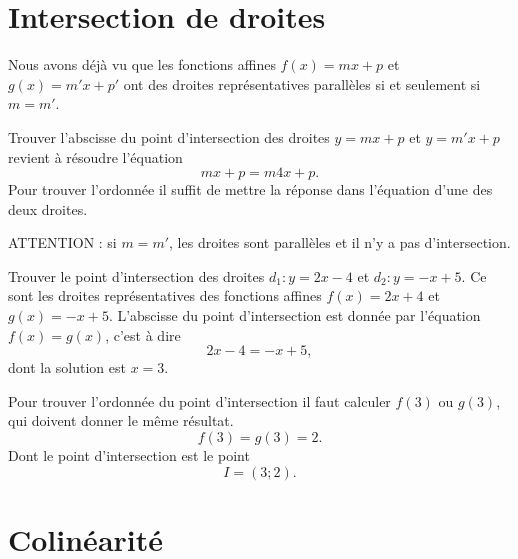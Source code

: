 \section{Intersection de droites}

Nous avons déjà vu que les fonctions affines \( f(x)=mx+p\) et \( g(x)=m'x+p'\) ont des droites représentatives parallèles si et seulement si \( m=m'\).

\begin{Aretenir}
    Trouver l'abscisse du point d'intersection des droites \( y=mx+p\) et \( y=m'x+p\) revient à résoudre l'équation
    \begin{equation}
        mx+p=m4x+p.
    \end{equation}
    Pour trouver l'ordonnée il suffit de mettre la réponse dans l'équation d'une des deux droites.

    ATTENTION : si \( m=m'\), les droites sont parallèles et il n'y a pas d'intersection.
\end{Aretenir}

\begin{example}
    Trouver le point d'intersection des droites \( d_1:y=2x-4\) et \( d_2:y=-x+5\). Ce sont les droites représentatives des fonctions affines \( f(x)=2x+4\) et \( g(x)=-x+5\). L'abscisse du point d'intersection est donnée par l'équation \( f(x)=g(x)\), c'est à dire
    \begin{equation}
        2x-4=-x+5,
    \end{equation}
    dont la solution est \( x=3\). 

    Pour trouver l'ordonnée du point d'intersection il faut calculer \( f(3)\) ou \( g(3)\), qui doivent donner le même résultat.
    \begin{equation}
        f(3)=g(3)=2.
    \end{equation}
    Dont le point d'intersection est le point
    \begin{equation}
        I=(3;2).
    \end{equation}
\end{example}

\section{Colinéarité}

